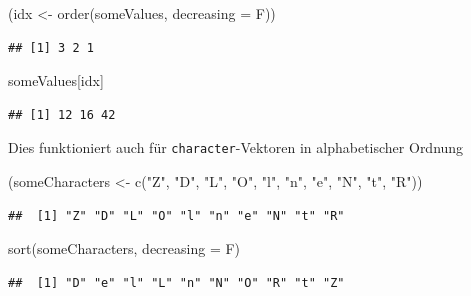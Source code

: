 \documentclass[
]{book}
\newenvironment{Shaded}{\begin{snugshade}}{\end{snugshade}}
\newcommand{\AttributeTok}[1]{\textcolor[rgb]{0.77,0.63,0.00}{#1}}
\newcommand{\FunctionTok}[1]{\textcolor[rgb]{0.00,0.00,0.00}{#1}}
\newcommand{\NormalTok}[1]{#1}
\newcommand{\OtherTok}[1]{\textcolor[rgb]{0.56,0.35,0.01}{#1}}
\newcommand{\StringTok}[1]{\textcolor[rgb]{0.31,0.60,0.02}{#1}}
\begin{document}
\begin{Shaded}
\begin{Highlighting}[]
\NormalTok{(idx }\OtherTok{\textless{}{-}} \FunctionTok{order}\NormalTok{(someValues, }\AttributeTok{decreasing =}\NormalTok{ F))}
\end{Highlighting}
\end{Shaded}

\begin{verbatim}
## [1] 3 2 1
\end{verbatim}

\begin{Shaded}
\begin{Highlighting}[]
\NormalTok{someValues[idx]}
\end{Highlighting}
\end{Shaded}

\begin{verbatim}
## [1] 12 16 42
\end{verbatim}

Dies funktioniert auch für \texttt{character}-Vektoren in alphabetischer Ordnung

\begin{Shaded}
\begin{Highlighting}[]
\NormalTok{(someCharacters }\OtherTok{\textless{}{-}}  \FunctionTok{c}\NormalTok{(}\StringTok{"Z"}\NormalTok{, }\StringTok{"D"}\NormalTok{, }\StringTok{"L"}\NormalTok{, }\StringTok{"O"}\NormalTok{, }\StringTok{"l"}\NormalTok{, }\StringTok{"n"}\NormalTok{, }\StringTok{"e"}\NormalTok{, }\StringTok{"N"}\NormalTok{, }\StringTok{"t"}\NormalTok{, }\StringTok{"R"}\NormalTok{))}
\end{Highlighting}
\end{Shaded}

\begin{verbatim}
##  [1] "Z" "D" "L" "O" "l" "n" "e" "N" "t" "R"
\end{verbatim}

\begin{Shaded}
\begin{Highlighting}[]
\FunctionTok{sort}\NormalTok{(someCharacters, }\AttributeTok{decreasing =}\NormalTok{ F)}
\end{Highlighting}
\end{Shaded}

\begin{verbatim}
##  [1] "D" "e" "l" "L" "n" "N" "O" "R" "t" "Z"
\end{verbatim}

\small
\end{document}
